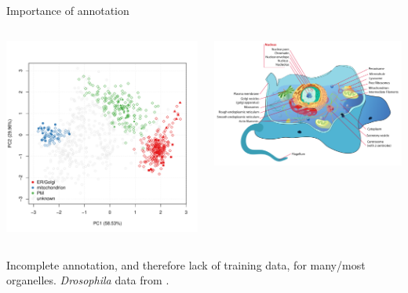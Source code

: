\begin{frame}{Importance of annotation}

  \begin{columns}[t]
    \begin{column}[T]{0.43\textwidth}
      \begin{centering}
        \includegraphics[width=1\linewidth]{figs_all/tan2009r1org.pdf}
      \end{centering}
    \end{column}
    \begin{column}[T]{0.56\textwidth}
      \includegraphics[width=1\linewidth]{figs_all/Animal_cell_structure.png}
    \end{column}
  \end{columns}
  Incomplete annotation, and therefore lack of training data, for
  many/most organelles. \textit{Drosophila} data from \cite{Tan2009}.
\end{frame}

